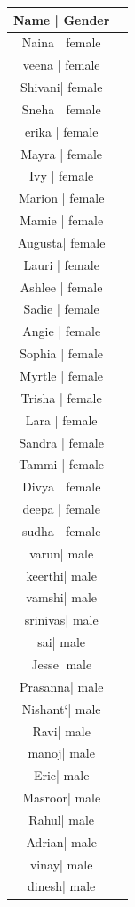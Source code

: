 \begin{itemize}
\begin{table}
\begin{center}
\begin{tabular}{| c | c |}
 Name | Gender\\ \hline
 Naina  | female\\ \hline		
 veena  | female\\ \hline		
 Shivani| female\\ \hline		
 Sneha  | female\\ \hline		
 erika  | female\\ \hline
 Mayra  | female\\ \hline	
 Ivy    | female\\ \hline
 Marion | female\\ \hline
 Mamie  | female\\ \hline	
 Augusta| female\\ \hline
 Lauri  | female\\ \hline	
 Ashlee | female\\ \hline
 Sadie  | female\\ \hline	
 Angie  | female\\ \hline
 Sophia | female\\ \hline
 Myrtle | female\\ \hline	
 Trisha | female\\ \hline
 Lara   | female\\ \hline	
 Sandra | female\\ \hline
 Tammi  | female\\ \hline	
 Divya  | female\\ \hline
 deepa  | female\\ \hline
 sudha  | female\\ \hline
varun| 		male\\ \hline		
keerthi|	male\\ \hline		
vamshi| 	male\\ \hline		
srinivas|	male\\ \hline		
sai| 		male\\ \hline
Jesse|		male\\ \hline	
Prasanna| 	male\\ \hline
Nishant`| 	male\\ \hline
Ravi| 		male\\ \hline	
manoj| 		male\\ \hline
Eric| 		male\\ \hline	
Masroor| 	male\\ \hline
Rahul| 		male\\ \hline	
Adrian|		male\\ \hline
vinay| 		male\\ \hline
dinesh| 	male\\ \hline

\end{tabular}
\end{center}
\end{table}
\end{itemize}
